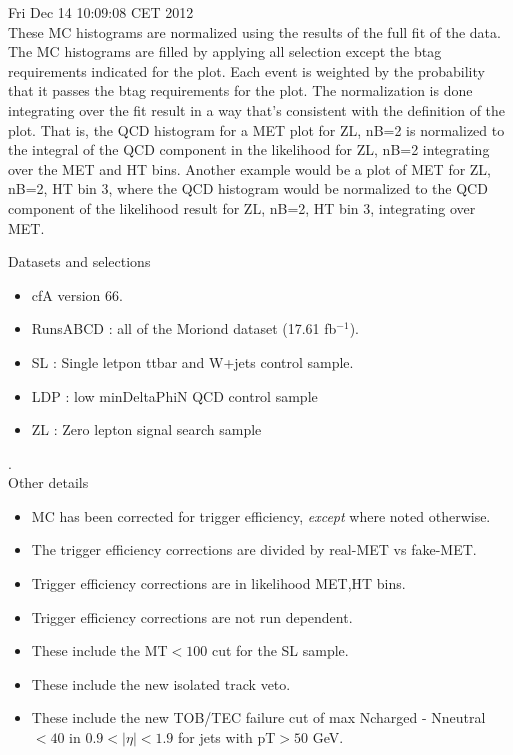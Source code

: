 \documentclass[11pt]{article}
\begin{document}
  Fri Dec 14 10:09:08 CET 2012 \\


  These MC histograms are normalized using the results of the full fit of the data.
  The MC histograms are filled by applying all selection except the btag requirements
  indicated for the plot.  Each event is weighted by the probability that it
  passes the btag requirements for the plot.
  The normalization is done integrating over the fit result in a way that's consistent
  with the definition of the plot.
  That is, the QCD histogram for a MET plot for ZL, nB=2 is normalized to the
  integral of the QCD component in the likelihood for ZL, nB=2 integrating
  over the MET and HT bins.
  Another example would be a plot of MET for ZL, nB=2, HT bin 3, where the
  QCD histogram would be normalized to the QCD component of the likelihood
  result for ZL, nB=2, HT bin 3, integrating over MET.

  \vspace{1cm}

   Datasets and selections
   \begin{itemize}
     \item cfA version 66.
     \item RunsABCD : all of the Moriond dataset (17.61 fb$^{-1}$).
     \item SL : Single letpon ttbar and W+jets control sample.
     \item LDP : low minDeltaPhiN QCD control sample
     \item ZL : Zero lepton signal search sample
   \end{itemize}

.\\

   Other details
   \begin{itemize}
     \item MC has been corrected for trigger efficiency, {\it except} where noted otherwise.
     \item  The trigger efficiency corrections are divided by real-MET vs fake-MET.
     \item Trigger efficiency corrections are in likelihood MET,HT bins.
     \item Trigger efficiency corrections are not run dependent.
     \item These include the MT$<100$ cut for the SL sample.
     \item These include the new isolated track veto.
     \item These include the new TOB/TEC failure cut of max Ncharged - Nneutral $<40$ in $0.9<|\eta|<1.9$ for
             jets with pT$>50$ GeV.
   \end{itemize}
\end{document}
